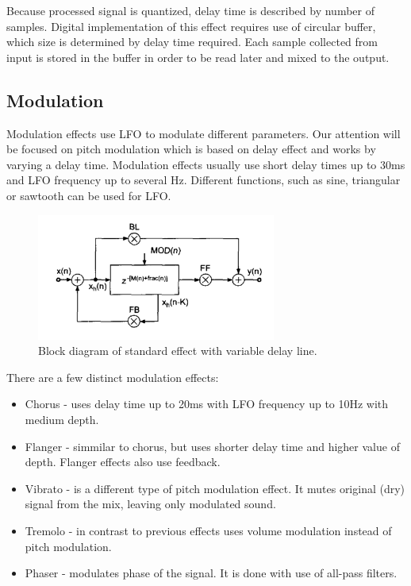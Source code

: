 \documentclass[a4paper,twoside,12pt]{book}
\begin{document}
Because processed signal is quantized,
delay time is described by number of samples.
Digital implementation of this effect requires use of circular buffer,
which size is determined by delay time required.
Each sample collected from input is stored in the buffer
in order to be read later and mixed to the output.

\subsection{Modulation}
Modulation effects use LFO to modulate different parameters.
Our attention will be focused on pitch modulation
which is based on delay effect and works by varying a delay time.
Modulation effects usually use short delay times up to 30ms
and LFO frequency up to several Hz.
Different functions, such as sine,
triangular or sawtooth can be used for LFO.

\begin{figure}[H]
    \centering
    \includegraphics[width=0.7\textwidth]{images/modulation}
    \caption{Block diagram of standard effect with variable delay line.}
    \label{fig:Mod}
\end{figure}

There are a few distinct modulation effects:
\begin{itemize}
    \item Chorus - uses delay time up to 20ms with LFO frequency up to 10Hz with medium depth.
    \item Flanger - simmilar to chorus, but uses shorter delay time and higher value of depth.
        Flanger effects also use feedback.
    \item Vibrato - is a different type of pitch modulation effect. It mutes original (dry) signal
        from the mix, leaving only modulated sound.
    \item Tremolo - in contrast to previous effects uses volume modulation instead of pitch modulation.
    \item Phaser - modulates phase of the signal. It is done with use of all-pass filters.
\end{itemize}
\end{document}
